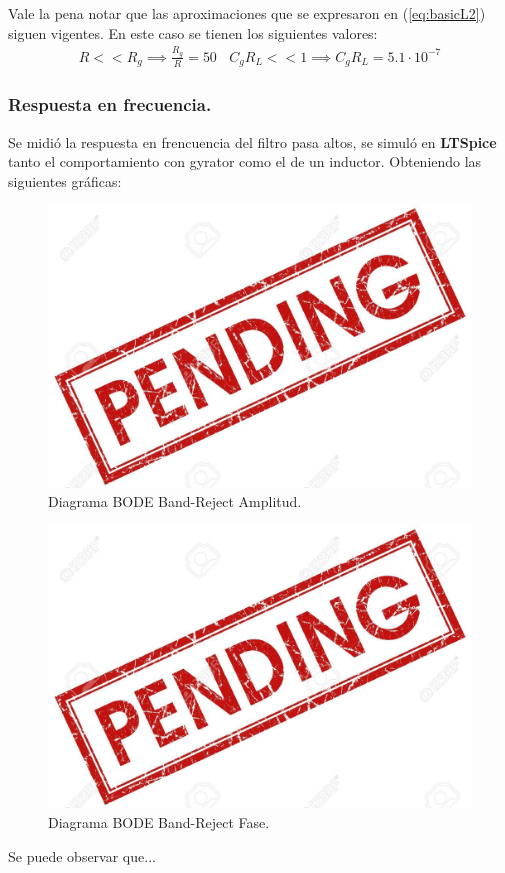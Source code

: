 \documentclass[a4paper]{article}
\begin{document}
Vale la pena notar que las aproximaciones que se expresaron en (\ref{eq:basicL2}) siguen vigentes. En este caso se tienen los siguientes valores:
\begin{align}  R<<R_g \implies  \frac{R_g}{R}=  50 \ \ \ \ C_gR_L << 1 \implies C_gR_L =5.1 \cdot 10^{-7} \end{align}

\subsubsection{Respuesta en frecuencia.}

Se midió la respuesta en frencuencia del filtro pasa altos, se simuló en \textbf{LTSpice}  tanto el comportamiento con gyrator como el de un inductor. Obteniendo las siguientes gráficas:
\begin{figure}[H]	
	\centering
	\includegraphics[width=\textwidth]{ImagenesEj2/bodebr.jpg}
	\caption{Diagrama BODE Band-Reject Amplitud.}
	\label{fig:bodebr}
\end{figure}
\begin{figure}[H]	
	\centering
	\includegraphics[width=\textwidth]{ImagenesEj2/bodebrp.jpg}
	\caption{Diagrama BODE Band-Reject Fase.}
	\label{fig:bodebrp}
\end{figure}
Se puede observar que...
\end{document}
